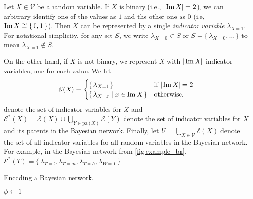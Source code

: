 \begin{definition}
  Let $X \in \mathcal{V}$ be a random variable. If $X$ is binary (i.e.,
  $|\operatorname{Im} X| = 2$), we can arbitrary identify one of the values as $1$ and the
  other one as $0$ (i.e, $\operatorname{Im} X \cong \{\, 0, 1 \,\}$). Then $X$ can be
  represented by a single \emph{indicator variable} $\lambda_{X=1}$. For
  notational simplicity, for any set $S$, we write $\lambda_{X=0} \in S$ or
  $S = \{\, \lambda_{X=0}, \dots \,\}$ to mean $\lambda_{X=1} \not\in S$.

  On the other hand, if $X$ is not binary, we represent $X$ with $|\operatorname{Im} X|$
  indicator variables, one for each value. We let
  \[
    \mathcal{E}(X) =
    \begin{cases}
      \{\, \lambda_{X=1} \,\} & \text{if } |\operatorname{Im} X| = 2 \\
      \{\, \lambda_{X=x} \mid x \in \operatorname{Im} X \,\} & \text{otherwise.}
    \end{cases}
  \]
  denote the set of indicator variables for $X$ and
  $\mathcal{E}^*(X) = \mathcal{E}(X) \cup \bigcup_{Y \in \mathrm{pa}(X)} \mathcal{E}(Y)$
  denote the set of indicator variables for $X$ and its parents in the Bayesian
  network. Finally, let $U = \bigcup_{X \in \mathcal{V}} \mathcal{E}(X)$ denote
  the set of all indicator variables for all random variables in the Bayesian
  network. For example, in the Bayesian network from \cref{fig:example_bn},
  $\mathcal{E}^*(T) = \{\, \lambda_{T=l}, \lambda_{T=m}, \lambda_{T=h}, \lambda_{W=1} \,\}$.
\end{definition}

\begin{algorithm}[t]
  \caption{Encoding a Bayesian network.}\label{alg:encoding}
  $\phi \gets 1$\;
  \Return{$\phi$}\;
\end{algorithm}

